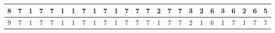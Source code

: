 \begin{sidewaystable}[]
\begin{tabular}{|c|c|c|c|c|c|c|c|c|c|c|c|c|c|c|c|c|c|c|c|c|c|c|c|c|}
    8       & 7                                               & 1                                               & 7                                               & 7                                               & 1                                               & 1                                               & 7                                               & 1                                               & 7                                               & 1                                                & 7                                                & 7                                                & 7                                               & 2                                               & 7                                               & 7                                               & 3                                               & 2                                               & 6                                               & 3                                                 & 6                                               & 2                                                & 6                                                & 5                                                \\ \hline
    9       & 7                                               & 1                                               & 7                                               & 7                                               & 1                                               & 1                                               & 7                                               & 1                                               & 7                                               & 1                                                & 7                                                & 7                                                & 7                                               & 1                                               & 7                                               & 7                                               & 2                                               & 1                                               & 6                                               & 1                                                 & 7                                               & 1                                                & 7                                                & 7                                                \\ \hline

\end{tabular}
\end{sidewaystable}

